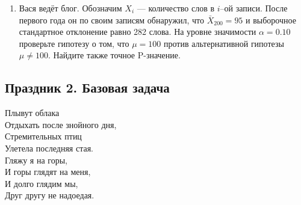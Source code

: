 \documentclass[12pt, a4paper]{article}\usepackage[]{graphicx}\usepackage[]{color}
\begin{document}
\begin{enumerate}
\item Вася ведёт блог. Обозначим $X_i$ — количество слов в $i$--ой записи. После первого года он по своим записям обнаружил, что $\bar{X}_{200}=95$ и выборочное стандартное отклонение равно 282 слова. На уровне значимости $\alpha=0.10$ проверьте гипотезу о том, что $\mu=100$ против альтернативной гипотезы $\mu\neq 100$. Найдите также точное P-значение.


\end{enumerate}



\subsection{Праздник 2. Базовая задача}



Плывут облака \\
Отдыхать после знойного дня,\\

Стремительных птиц \\
Улетела последняя стая. \\

Гляжу я на горы, \\
И горы глядят на меня, \\

И долго глядим мы,\\
Друг другу не надоедая.\\


\vspace{30pt}
\end{document}
